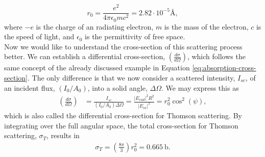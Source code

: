 \begin{equation}
r_0 = \frac{e^2}{4\pi \epsilon_0 m c^2} = 2.82\cdot 10^{-5}\si{\angstrom},
\label{eq:thomson-scattering-length}
\end{equation}
where $-e$ is the charge of an radiating electron, $m$ is the mass of the electron, $c$ is the speed of light, and $\epsilon_0$ is the permittivity of free space.\\[1\baselineskip]
%
Now we would like to understand the cross-section of this scattering process better. We can establish a differential cross-section, $\left(\tfrac{d\sigma}{d\Omega}\right)$, which follows the same concept of the already discussed example in Equation \eqref{eq:absorption-cross-section}. The only difference is that we now consider a scattered intensity, $I_{sc}$, of an incident flux, $\left(I_{0}/A_{0}\right)$, into a solid angle, $\Delta \Omega$. We may express this as
\begin{align}
\left(\frac{d\sigma}{d\Omega}\right)&=\frac{I_{sc}}{\left(I_{0}/A_{0}\right)\Delta\Omega}=\frac{\lvert E_{rad}\rvert^2 R^2}{\lvert E_{in}\rvert^2}=r_0^2 \cos^{2}\left(\psi\right),
\label{eq:scattering-crosssection}
\end{align}
which is also called the differential cross-section for Thomson scattering. By integrating over the full angular space, the total cross-section for Thomson scattering, $\sigma_{T}$, results in
\begin{align}
\sigma_{T} = \left(\frac{8\pi}{3}\right) r_{0}^{2} = \SI{0.665}{\barn}.
\label{eq:Thomson-cross-section}
\end{align}
